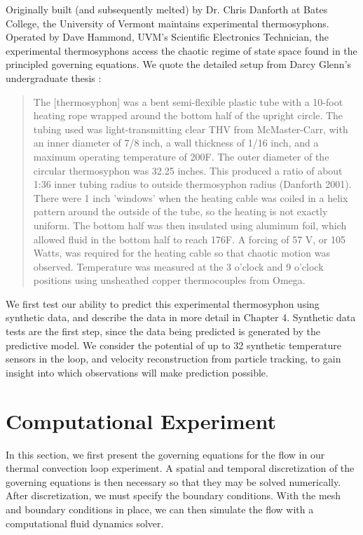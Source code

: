 Originally built (and subsequently melted) by Dr. Chris Danforth at Bates College, the University of Vermont maintains experimental thermosyphons.
Operated by Dave Hammond, UVM's Scientific Electronics Technician, the experimental thermosyphons access the chaotic regime of state space found in the principled governing equations.
We quote the detailed setup from Darcy Glenn's undergraduate thesis :
\begin{quote}
The [thermosyphon] was a bent semi-flexible plastic tube with a 10-foot heating rope wrapped around the bottom half of the upright circle.
The tubing used was light-transmitting clear THV from McMaster-Carr, with an inner diameter of 7/8 inch, a wall thickness of 1/16 inch, and a maximum operating temperature of 200F.
The outer diameter of the circular thermosyphon was 32.25 inches.
This produced a ratio of about 1:36 inner tubing radius to outside thermosyphon radius (Danforth 2001).
There were 1 inch 'windows' when the heating cable was coiled in a helix pattern around the outside of the tube, so the heating is not exactly uniform.
The bottom half was then insulated using aluminum foil, which allowed fluid in the bottom half to reach 176F.
A forcing of 57 V, or 105 Watts, was required for the heating cable so that chaotic motion was observed.
Temperature was measured at the 3 o'clock and 9 o'clock positions using unsheathed copper thermocouples from Omega.
\end{quote}

We first test our ability to predict this experimental thermosyphon using synthetic data, and describe the data in more detail in Chapter 4.
Synthetic data tests are the first step, since the data being predicted is generated by the predictive model.
We consider the potential of up to 32 synthetic temperature sensors in the loop, and velocity reconstruction from particle tracking, to gain insight into which observations will make prediction possible.

\section{Computational Experiment}
In this section, we first present the governing equations for the flow in our thermal convection loop experiment.
A spatial and temporal discretization of the governing equations is then necessary so that they may be solved numerically.
After discretization, we must specify the boundary conditions.
With the mesh and boundary conditions in place, we can then simulate the flow with a computational fluid dynamics solver.

